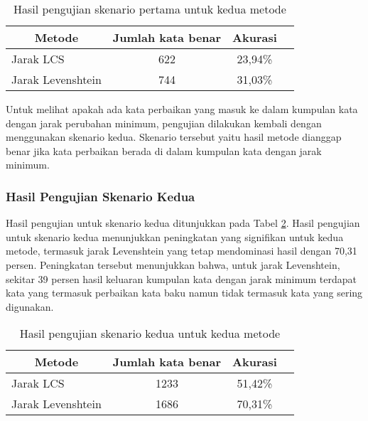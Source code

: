 \begin{table}[H]
    \captionsetup{justification=justified,singlelinecheck=false}
    \caption{Hasil pengujian skenario pertama untuk kedua metode}
    \label{tbl:result_1}
    \centering
    \begin{tabularx}{\textwidth}{|X|c|c|c|}
        \hline
        \multicolumn{1}{|c|}{\textbf{Metode}} & \textbf{Jumlah kata benar} & \textbf{Akurasi} \\ \hline
        Jarak LCS & 622 & 23,94\% \\ \hline
        Jarak Levenshtein & 744 & 31,03\% \\ \hline
    \end{tabularx}
\end{table}

Untuk melihat apakah ada kata perbaikan yang masuk ke dalam kumpulan kata dengan jarak perubahan minimum, pengujian dilakukan kembali dengan menggunakan skenario kedua. Skenario tersebut yaitu hasil metode dianggap benar jika kata perbaikan berada di dalam kumpulan kata dengan jarak minimum.

\subsubsection{Hasil Pengujian Skenario Kedua}

Hasil pengujian untuk skenario kedua ditunjukkan pada Tabel \ref{tbl:result_2}. Hasil pengujian untuk skenario kedua menunjukkan peningkatan yang signifikan untuk kedua metode, termasuk jarak Levenshtein yang tetap mendominasi hasil dengan 70,31 persen. Peningkatan tersebut menunjukkan bahwa, untuk jarak Levenshtein, sekitar 39 persen hasil keluaran kumpulan kata dengan jarak minimum terdapat kata yang termasuk perbaikan kata baku namun tidak termasuk kata yang sering digunakan.

\begin{table}[H]
    \captionsetup{justification=justified,singlelinecheck=false}
    \caption{Hasil pengujian skenario kedua untuk kedua metode}
    \label{tbl:result_2}
    \centering
    \begin{tabularx}{\textwidth}{|X|c|c|c|}
        \hline
        \multicolumn{1}{|c|}{\textbf{Metode}} & \textbf{Jumlah kata benar} & \textbf{Akurasi} \\ \hline
        Jarak LCS & 1233 & 51,42\% \\ \hline
        Jarak Levenshtein & 1686 & 70,31\% \\ \hline
    \end{tabularx}
\end{table}